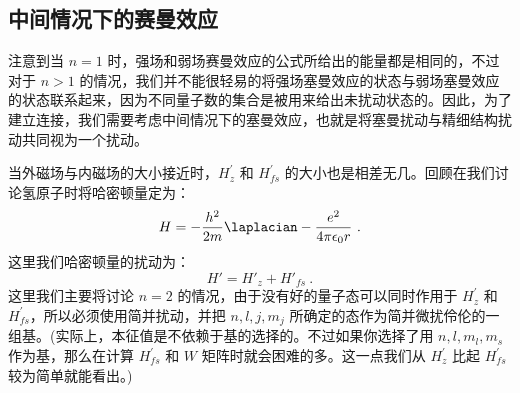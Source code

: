 \subsection{中间情况下的赛曼效应}
注意到当 $n=1$ 时，强场和弱场赛曼效应的公式所给出的能量都是相同的，不过对于 $n > 1$ 的情况，我们并不能很轻易的将强场塞曼效应的状态与弱场塞曼效应的状态联系起来，因为不同量子数的集合是被用来给出未扰动状态的。因此，为了建立连接，我们需要考虑中间情况下的塞曼效应，也就是将塞曼扰动与精细结构扰动共同视为一个扰动。

当外磁场与内磁场的大小接近时，$H_z^{'}$ 和 $H_{fs}^{'}$ 的大小也是相差无几。回顾在我们讨论氢原子时将哈密顿量定为：\begin{equation}
H=-\frac{h^2}{2m}\laplacian-\frac{e^2}{4\pi\epsilon_0 r}~.
\end{equation}
这里我们哈密顿量的扰动为：
\begin{equation}
H'=H'_z+H'_{fs}~.
\end{equation}
这里我们主要将讨论 $n=2$ 的情况，由于没有好的量子态可以同时作用于 $H_z^{'}$ 和 $H_{fs}^{'}$，所以必须使用简并扰动，并把 $n,l,j,m_j$ 所确定的态作为简并微扰伶伦的一组基。(实际上，本征值是不依赖于基的选择的。不过如果你选择了用 $n,l,m_l,m_s$ 作为基，那么在计算 $H_{fs}^{'}$ 和 $W$ 矩阵时就会困难的多。这一点我们从 $H_z^{'}$ 比起 $H_{fs}^{'}$ 较为简单就能看出。)

